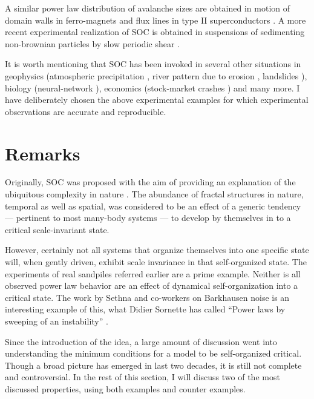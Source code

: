 \documentclass[11pt,a4paper]{book}
\begin{document}
A similar power law distribution of avalanche sizes are obtained in
motion of domain walls in ferro-magnets \cite{feromag1,feromag2} and
flux lines in type II superconductors \cite{sup1,sup2}.
A more recent
experimental realization of SOC is obtained in suspensions of
sedimenting non-brownian particles by slow
periodic shear \cite{corte}.

It is worth mentioning that SOC has been invoked in
several other situations in geophysics (atmospheric precipitation
\cite{presp}, river
pattern due to erosion \cite{erotion}, landslides \cite{land}),
biology (neural-network \cite{nunet}), economics (stock-market crashes
\cite{smcr}) and many
more. I have deliberately chosen the above experimental examples for which
experimental observations are accurate and reproducible.
\section{Remarks}
Originally, SOC was proposed with the aim of providing an explanation
of the ubiquitous complexity in nature \cite{btw}. The abundance of fractal
structures in nature, temporal as well as spatial, was considered to be an
effect of a generic tendency --- pertinent to most many-body systems
--- to develop by themselves in to a critical scale-invariant state.

However, certainly not all systems that organize themselves into one
specific state will, when gently driven, exhibit scale invariance in
that self-organized state. The experiments of real sandpiles referred
earlier are a prime example. Neither is all observed power law
behavior are an effect of dynamical self-organization into a critical
state. The work by Sethna and co-workers on Barkhausen noise
\cite{sethna} is an interesting example of this, what Didier Sornette has called ``Power laws by
sweeping of an instability'' \cite{sornet}.

Since the introduction of the idea, a large amount of discussion went into
understanding the minimum conditions for a model to be
self-organized critical. Though a broad picture has emerged in last
two decades, it is still not complete and controversial. In the rest of this section, I will
discuss two of the most discussed properties, using both examples and counter examples.
\end{document}
